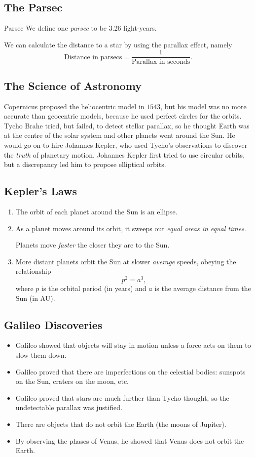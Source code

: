 \documentclass[class=article, crop=false]{standalone}
\begin{document}
  \subsection{The Parsec}
  \begin{definition}{Parsec}
    We define one \emph{parsec} to be 3.26 light-years.
  \end{definition}
  We can calculate the distance to a star by using the parallax effect, namely
  \[
    \text{Distance in parsecs} = \frac{1}{\text{Parallax in seconds}}.
  \]
  \subsection{The Science of Astronomy}
  Copernicus proposed the heliocentric model in $1543$, but his model was no more accurate than geocentric models, because he used perfect circles for the orbits. Tycho Brahe tried, but failed, to detect stellar parallax, so he thought Earth was at the centre of the solar system and other planets went around the Sun. He would go on to hire Johannes Kepler, who used Tycho's observations to discover the \emph{truth} of planetary motion. Johannes Kepler first tried to use circular orbits, but a discrepancy led him to propose elliptical orbits.
  \subsection{Kepler's Laws}
  \begin{enumerate}
    \item The orbit of each planet around the Sun is an ellipse.
    \item As a planet moves around its orbit, it sweeps out \emph{equal areas in equal times}.
    \begin{note}{}
      Planets move \emph{faster} the closer they are to the Sun.
    \end{note}
    \item More distant planets orbit the Sun at slower \emph{average} speeds, obeying the relationship
    \[
      p^2 = a^3,
    \]
    where $p$ is the orbital period (in years) and $a$ is the average distance from the Sun (in AU).
  \end{enumerate}
  \subsection{Galileo Discoveries}
  \begin{itemize}
    \item Galileo showed that objects will stay in motion unless a force acts on them to slow them down.
    \item Galileo proved that there are imperfections on the celestial bodies: sunspots on the Sun, craters on the moon, etc.
    \item Galileo proved that stars are much further than Tycho thought, so the undetectable parallax was justified.
    \item There are objects that do not orbit the Earth (the moons of Jupiter).
    \item By observing the phases of Venus, he showed that Venus does not orbit the Earth.
  \end{itemize}
\end{document}
